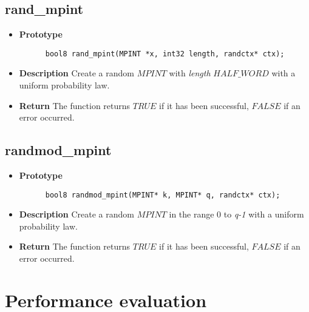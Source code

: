\documentclass[10pt,a4paper]{article}
\begin{document}
  \subsection{rand\_mpint}
  
  \begin{itemize}
    \item [] \textbf{Prototype}
    \begin{lstlisting}
      bool8 rand_mpint(MPINT *x, int32 length, randctx* ctx);
    \end{lstlisting}
    \item [] \textbf{Description} Create a random $MPINT$ with \textit{length} $HALF\_WORD$ with a uniform probability law.
    \item [] \textbf{Return} The function returns $TRUE$ if it has been successful, $FALSE$ if an error occurred.
  \end{itemize}
  
  \subsection{randmod\_mpint}
  
  \begin{itemize}
    \item [] \textbf{Prototype}
    \begin{lstlisting}
      bool8 randmod_mpint(MPINT* k, MPINT* q, randctx* ctx);
    \end{lstlisting}
    \item [] \textbf{Description} Create a random $MPINT$ in the range 0 to \textit{q-1} with a uniform probability law.
    \item [] \textbf{Return} The function returns $TRUE$ if it has been successful, $FALSE$ if an error occurred.
  \end{itemize}
  
  
  
  \section{Performance evaluation} \label{perfeval}
\end{document}
